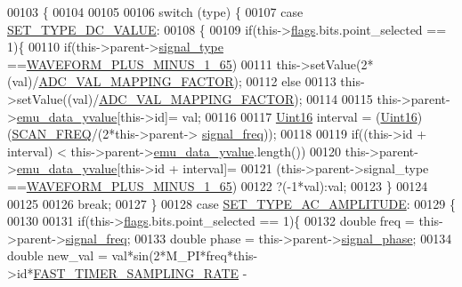 \begin{DoxyCode}
00103 \{
00104 
00105 
00106     \textcolor{keywordflow}{switch} (type) \{
00107     \textcolor{keywordflow}{case} \hyperlink{a00034_a347f6ec80828b93988d22989c0df015f}{SET\_TYPE\_DC\_VALUE}:
00108      \{
00109         \textcolor{keywordflow}{if}(this->\hyperlink{a00024_ade6449558d429b66e5ed1381bc9b9060}{flags}.bits.point\_selected == 1)\{
00110             \textcolor{keywordflow}{if}(this->parent->\hyperlink{a00004_a070edaec5aee6ba1f5a6866bc32c8ce4}{signal\_type} ==\hyperlink{a00034_a0923d3b365a36e1e8c401cec964aa36f}{WAVEFORM\_PLUS\_MINUS\_1\_65})
00111             this->setValue(2*(val)/\hyperlink{a00031_ada92d3eeeec0cbeee41e76a52d145792}{ADC\_VAL\_MAPPING\_FACTOR});
00112             \textcolor{keywordflow}{else}
00113             this->setValue((val)/\hyperlink{a00031_ada92d3eeeec0cbeee41e76a52d145792}{ADC\_VAL\_MAPPING\_FACTOR});
00114 
00115         this->parent->\hyperlink{a00004_ad922d05d1e988d84f404c115fe909f72}{emu\_data\_yvalue}[this->id]= val;
00116 
00117         \hyperlink{a00001_aae7407b021d43f7193a81a58cfb3e297}{Uint16} interval = (\hyperlink{a00001_aae7407b021d43f7193a81a58cfb3e297}{Uint16})(\hyperlink{a00031_a8127170b687c1f67a968886c128e76e4}{SCAN\_FREQ}/(2*this->parent->
      \hyperlink{a00004_a67039999d520fc483fab521fae5ddde4}{signal\_freq}));
00118 
00119         \textcolor{keywordflow}{if}((this->\textcolor{keywordtype}{id} + interval) < this->parent->\hyperlink{a00004_ad922d05d1e988d84f404c115fe909f72}{emu\_data\_yvalue}.length())
00120         this->parent->\hyperlink{a00004_ad922d05d1e988d84f404c115fe909f72}{emu\_data\_yvalue}[this->id + interval]=
00121         (this->parent->signal\_type ==\hyperlink{a00034_a0923d3b365a36e1e8c401cec964aa36f}{WAVEFORM\_PLUS\_MINUS\_1\_65})
00122         ?(-1*val):val;
00123         \}
00124 
00125 
00126         \textcolor{keywordflow}{break};
00127     \}
00128     \textcolor{keywordflow}{case} \hyperlink{a00034_a704f34d2cc6c149f96e9da9d2a1aa8c0}{SET\_TYPE\_AC\_AMPLITUDE}:
00129       \{
00130 
00131         \textcolor{keywordflow}{if}(this->\hyperlink{a00024_ade6449558d429b66e5ed1381bc9b9060}{flags}.bits.point\_selected == 1)\{
00132         \textcolor{keywordtype}{double} freq    = this->parent->\hyperlink{a00004_a67039999d520fc483fab521fae5ddde4}{signal\_freq};
00133         \textcolor{keywordtype}{double} phase   = this->parent->\hyperlink{a00004_af08de88fdfe283086e3cca97a2965678}{signal\_phase};
00134         \textcolor{keywordtype}{double} new\_val = val*sin(2*M\_PI*freq*this->\textcolor{keywordtype}{id}*\hyperlink{a00031_a3a4dcb8af26a561d90607a41a3745806}{FAST\_TIMER\_SAMPLING\_RATE} - 

\end{DoxyCode}
